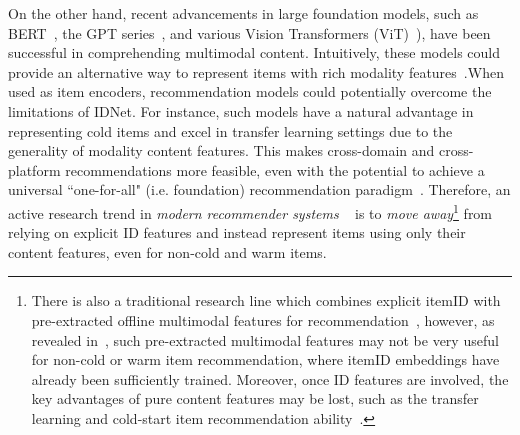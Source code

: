 \documentclass[sigconf]{acmart}
\begin{document}
 
  On the other hand, recent advancements in large foundation models, such as BERT~\cite{devlin2018bert}, the GPT series~\cite{radford2018improving,radford2019language,brown2020language}, and various Vision Transformers (ViT)~\cite{DBLP:conf/iclr/DosovitskiyB0WZ21}), have been successful in comprehending multimodal content. Intuitively, these models could provide an alternative way to represent items with rich modality features~\cite{wu2021empowering,xiao2022training,yuan2023go}.When used as item encoders, recommendation models could potentially overcome the limitations of IDNet. For instance, such models have a natural advantage in representing cold items and excel in transfer learning settings due to the generality of modality content features.  This makes cross-domain and cross-platform recommendations more feasible, even with the potential to achieve a universal ``one-for-all" (i.e. foundation) recommendation paradigm~\cite{shin2021one4all,hou2022towards,geng2022recommendation, fu2023exploring}.
Therefore, an active research trend in \textit{modern recommender systems} ~\cite{yuan2023go,Rajput2023gen,wang2022transrec,hou2022learning,singh2023better,ding2021zero,li2023text,li2023exploring} is to \textit{move away}\footnote{There is also a traditional research line 
which  combines  explicit itemID with pre-extracted offline multimodal features  for recommendation~\cite{mcauley2015image, he2016vbpr,he2016ups,du2020learn,sun2019research}, however, as revealed  in~\cite{yuan2023go}, such pre-extracted multimodal features  may not be very useful  for non-cold or warm item recommendation, where itemID embeddings have already been sufficiently trained.
Moreover, once ID features are involved, the key advantages of pure content features may be lost, such as the transfer learning and
 cold-start item recommendation ability~\cite{ding2021zero,hou2022towards,wang2022transrec}.  
} from relying on explicit ID features and instead represent items  using only  their content features, even for non-cold and warm items.


	
 
\end{document}
